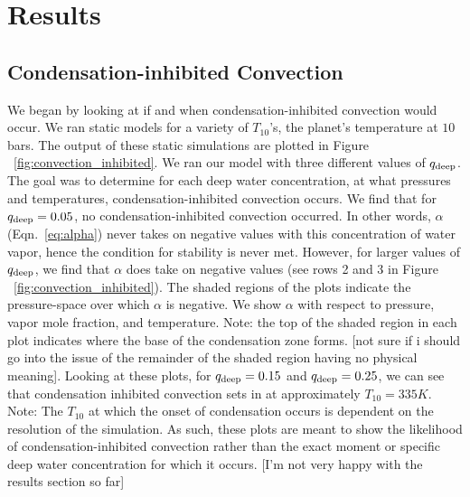 \documentclass[11pt]{ucscthesisbs}
\begin{document}
\chapter{Results}

\section{Condensation-inhibited Convection}
We began by looking at if and when condensation-inhibited convection would occur. We ran static models for a variety of $T_{10}$'s, the planet's temperature at $10$ bars. The output of these static simulations are plotted in Figure ~\ref{fig:convection_inhibited}. We ran our model with three different values of $q_{\rm deep}$. The goal was to determine for each deep water concentration, at what pressures and temperatures, condensation-inhibited convection occurs. We find that for $q_{\rm deep} = 0.05$, no condensation-inhibited convection occurred. In other words, $\alpha$ (Eqn.~\ref{eq:alpha})  never takes on negative values with this concentration of water vapor, hence the condition for stability is never met. However, for larger values of $q_{\rm deep}$, we find that $\alpha$ does take on negative values (see rows 2 and 3 in Figure ~\ref{fig:convection_inhibited}). The shaded regions of the plots indicate the pressure-space over which $\alpha$ is negative. We show $\alpha$ with respect to pressure, vapor mole fraction, and temperature. Note: the top of the shaded region in each plot indicates where the base of the condensation zone forms. [not sure if i should go into the issue of the remainder of the shaded region having no physical meaning]. Looking at these plots, for $q_{\rm deep} = 0.15$ and $q_{\rm deep} = 0.25$, we can see that condensation inhibited convection sets in at approximately $T_{10} = 335K$. Note: The $T_{10}$ at which the onset of condensation occurs is dependent on the resolution of the simulation. As such, these plots are meant to show the likelihood of condensation-inhibited convection rather than the exact moment or specific deep water concentration for which it occurs. [I'm not very happy with the results section so far]
\end{document}
